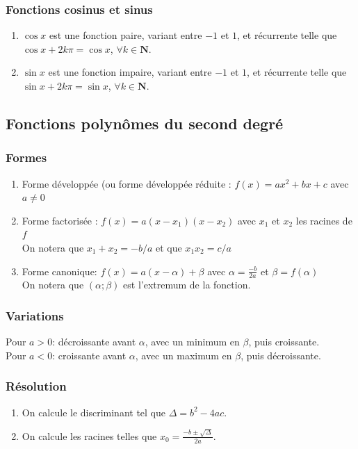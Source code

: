 \documentclass{article}
\begin{document}
\subsubsection{Fonctions cosinus et sinus}
    \begin{enumerate}
        \item $\cos x$ est une fonction paire, variant entre $-1$ et $1$, et récurrente telle que $\cos{x + 2k\pi} = \cos x$, $\forall k \in \mathbf{N}$.
        \item $\sin x$ est une fonction impaire, variant entre $-1$ et $1$, et récurrente telle que $\sin{x + 2k\pi} = \sin x$, $\forall k \in \mathbf{N}$.
    \end{enumerate}


\subsection{Fonctions polynômes du second degré}

\subsubsection{Formes}
    \begin{enumerate}
        \item Forme développée (ou forme développée réduite : $f(x) = ax^2+bx+c$ avec $a \neq 0$
        \item Forme factorisée : $f(x) = a(x - x_1)(x - x_2)$ avec $x_1$ et $x_2$ les racines de $f$\\
        On notera que $x_1+x_2=-b/a$ et que $x_1x_2=c/a$
        \item Forme canonique: $f(x) = a(x-\alpha)+\beta$ avec $\alpha = \frac{-b}{2a}$ et $\beta = f(\alpha)$\\
        On notera que $(\alpha;\beta)$ est l'extremum de la fonction.
    \end{enumerate}

\subsubsection{Variations}
    Pour $a > 0$: décroissante avant $\alpha$, avec un minimum en $\beta$, puis croissante.\\
    Pour $a < 0$: croissante avant $\alpha$, avec un maximum en $\beta$, puis décroissante.

\subsubsection{Résolution}
    \begin{enumerate}
        \item On calcule le discriminant tel que $\Delta = b^2 - 4ac$.
        \item On calcule les racines telles que $x_0 = \frac{-b \pm \sqrt{\Delta}}{2a}$.
    \end{enumerate}
\end{document}
